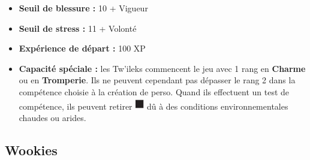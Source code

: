 \documentclass[twoside]{article}
\begin{document}
\begin{minipage}{0.7\textwidth}\raggedleft
	\begin{itemize}
		\item \textbf{Seuil de blessure :} 10 + Vigueur 
		\item \textbf{Seuil de stress :} 11 + Volonté 
		\item \textbf{Expérience de départ :} 100 XP
		\item \textbf{Capacité spéciale :} les Tw'ileks commencent le jeu avec 1 rang en \textbf{Charme} ou en \textbf{Tromperie}. Ils ne peuvent cependant pas dépasser le rang 2 dans la compétence choisie à la création de perso. Quand ils effectuent un test de compétence, ils peuvent retirer {\Large \includegraphics[height=\fontcharht\font`\B]{../img/dice_black}} dû à des conditions environnementales chaudes ou arides.
	\end{itemize}
\end{minipage}

\subsection*{Wookies}
\end{document}
